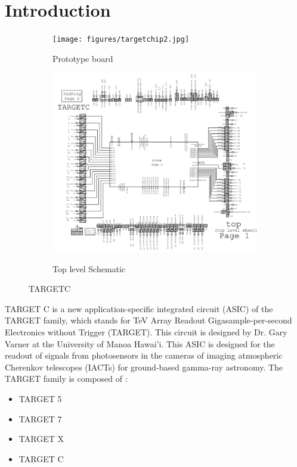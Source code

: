 \section{Introduction}

\begin{figure}[H]
    \centering
    \begin{subfigure}[b]{0.35\textwidth}
			\texttt{[image: figures/targetchip2.jpg]}\\
			\caption{\label{fig:TC_chip} Prototype board}
    \end{subfigure}\hfill
    \begin{subfigure}[b]{0.55\textwidth}
			\includegraphics[width=1\textwidth]{figures/TargetC_Top.png}\\
			\caption{\label{fig:TC_top} Top level Schematic}
    \end{subfigure}
    \caption{TARGETC}\label{fig:tctopchip}
\end{figure}

\noindent
TARGET C is a new application-specific integrated circuit (ASIC) of the TARGET family, which stands for TeV Array Readout Gigasample-per-second Electronics without Trigger (TARGET). This circuit is designed by Dr. Gary Varner at the University of Manoa Hawai'i. This ASIC is designed for the readout of signals from photosensors in the cameras of imaging atmospheric Cherenkov telescopes (IACTs) for ground-based gamma-ray astronomy. The TARGET family is composed of :
\begin{itemize}
  \item TARGET 5
  \item TARGET 7
  \item TARGET X
  \item TARGET C
\end{itemize}


